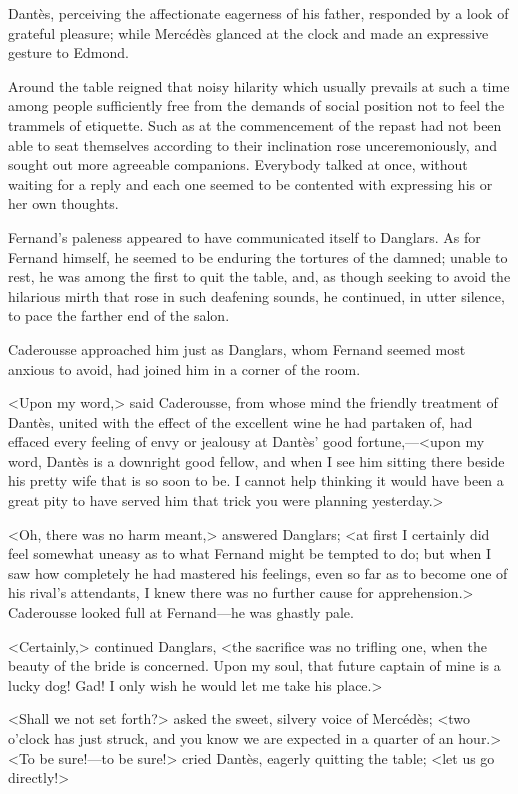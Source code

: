  Dantès, perceiving the affectionate eagerness of his father, responded by a look of grateful pleasure; while Mercédès glanced at the clock and made an expressive gesture to Edmond. 

 Around the table reigned that noisy hilarity which usually prevails at such a time among people sufficiently free from the demands of social position not to feel the trammels of etiquette. Such as at the commencement of the repast had not been able to seat themselves according to their inclination rose unceremoniously, and sought out more agreeable companions. Everybody talked at once, without waiting for a reply and each one seemed to be contented with expressing his or her own thoughts. 

 Fernand's paleness appeared to have communicated itself to Danglars. As for Fernand himself, he seemed to be enduring the tortures of the damned; unable to rest, he was among the first to quit the table, and, as though seeking to avoid the hilarious mirth that rose in such deafening sounds, he continued, in utter silence, to pace the farther end of the salon. 

 Caderousse approached him just as Danglars, whom Fernand seemed most anxious to avoid, had joined him in a corner of the room. 

 <Upon my word,> said Caderousse, from whose mind the friendly treatment of Dantès, united with the effect of the excellent wine he had partaken of, had effaced every feeling of envy or jealousy at Dantès' good fortune,—<upon my word, Dantès is a downright good fellow, and when I see him sitting there beside his pretty wife that is so soon to be. I cannot help thinking it would have been a great pity to have served him that trick you were planning yesterday.> 

 <Oh, there was no harm meant,> answered Danglars; <at first I certainly did feel somewhat uneasy as to what Fernand might be tempted to do; but when I saw how completely he had mastered his feelings, even so far as to become one of his rival's attendants, I knew there was no further cause for apprehension.> Caderousse looked full at Fernand—he was ghastly pale. 

 <Certainly,> continued Danglars, <the sacrifice was no trifling one, when the beauty of the bride is concerned. Upon my soul, that future captain of mine is a lucky dog! Gad! I only wish he would let me take his place.> 

 <Shall we not set forth?> asked the sweet, silvery voice of Mercédès; <two o'clock has just struck, and you know we are expected in a quarter of an hour.>  <To be sure!—to be sure!> cried Dantès, eagerly quitting the table; <let us go directly!> 

